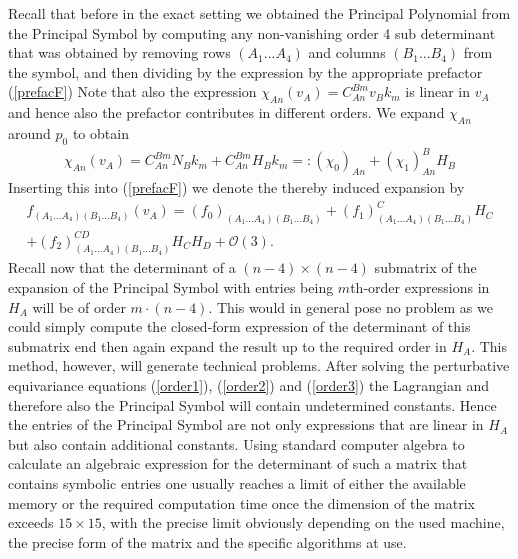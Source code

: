 Recall that before in the exact setting we obtained the Principal Polynomial from the Principal Symbol by computing any non-vanishing order 4 sub determinant that was obtained by removing rows $(A_1...A_4)$ and columns $(B_1...B_4)$ from the symbol, and then dividing by the expression by the appropriate prefactor (\ref{prefacF})
Note that also the expression $\chi_{An}(v_A) = C_{An}^{Bm}v_Bk_m$ is linear in $v_A$ and hence also the prefactor contributes in different orders. We expand $\chi_{An}$ around $p_0$ to obtain
\begin{align}
\chi_{An}(v_A) =  C^{Bm}_{An} N_B k_m + C^{Bm}_{An} H_B k_m =: (\chi_0)_{An} + (\chi_1)^B_{An}H_B
\end{align}
Inserting this into (\ref{prefacF}) we denote the thereby induced expansion by
\begin{multline}\label{prefacExp}
    f_{(A_1...A_4)(B_1...B_4)}(v_A) = (f_0)_{(A_1...A_4)(B_1...B_4)} + (f_1)^C_{(A_1...A_4)(B_1...B_4)}H_C\\ + (f_2)^{CD}_{(A_1...A_4)(B_1...B_4)}H_CH_D
    + \mathcal{O}(3).
\end{multline}
Recall now that the determinant of a $(n-4) \times (n-4)$ submatrix of the expansion of the Principal Symbol with entries being $m$th-order expressions in $H_A$ will be of order $m\cdot(n-4)$. This would in general pose no problem as we could simply compute the closed-form expression of the determinant of this submatrix end then again expand the result up to the required order in $H_A$. This method, however, will generate technical problems. After solving the perturbative equivariance equations (\ref{order1}), (\ref{order2}) and (\ref{order3}) the Lagrangian and therefore also the Principal Symbol will contain undetermined constants. Hence the entries of the Principal Symbol are not only expressions that are linear in $H_A$ but also contain additional constants. Using standard computer algebra to calculate an algebraic expression for the determinant of such a matrix that contains symbolic entries one usually reaches a limit of either the available memory or the required computation time once the dimension of the matrix exceeds $15 \times 15 $, with the precise limit obviously depending on the used machine, the precise form of the matrix and the specific algorithms at use. 

